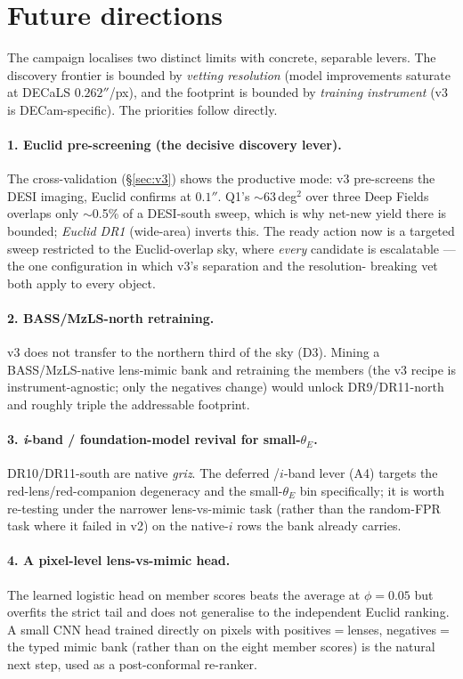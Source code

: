 \section{Future directions}
\label{sec:future}
The campaign localises two distinct limits with concrete, separable levers. The discovery frontier
is bounded by \emph{vetting resolution} (model improvements saturate at DECaLS $0.262''$/px), and
the footprint is bounded by \emph{training instrument} (v3 is DECam-specific). The priorities follow
directly.

\paragraph{1. Euclid pre-screening (the decisive discovery lever).} The cross-validation
(\S\ref{sec:v3}) shows the productive mode: v3 pre-screens the DESI imaging, Euclid confirms at
$0.1''$. Q1's $\sim$63\,deg$^2$ over three Deep Fields overlaps only $\sim$0.5\% of a DESI-south
sweep, which is why net-new yield there is bounded; \emph{Euclid DR1} (wide-area) inverts this. The
ready action now is a targeted sweep restricted to the Euclid-overlap sky, where \emph{every}
candidate is escalatable --- the one configuration in which v3's separation and the resolution-
breaking vet both apply to every object.

\paragraph{2. BASS/MzLS-north retraining.} v3 does not transfer to the northern third of the sky
(D3). Mining a BASS/MzLS-native lens-mimic bank and retraining the members (the v3 recipe is
instrument-agnostic; only the negatives change) would unlock DR9/DR11-north and roughly triple the
addressable footprint.

\paragraph{3. \emph{i}-band / foundation-model revival for small-$\theta_E$.} DR10/DR11-south are
native \emph{griz}. The deferred \aion{}/$i$-band lever (A4) targets the red-lens/red-companion
degeneracy and the small-$\theta_E$ bin specifically; it is worth re-testing under the narrower
lens-vs-mimic task (rather than the random-FPR task where it failed in v2) on the native-$i$ rows
the bank already carries.

\paragraph{4. A pixel-level lens-vs-mimic head.} The learned logistic head on member scores beats
the average at $\phi{=}0.05$ but overfits the strict tail and does not generalise to the independent
Euclid ranking. A small CNN head trained directly on pixels with positives$=$lenses,
negatives$=$the typed mimic bank (rather than on the eight member scores) is the natural next step,
used as a post-conformal re-ranker.


